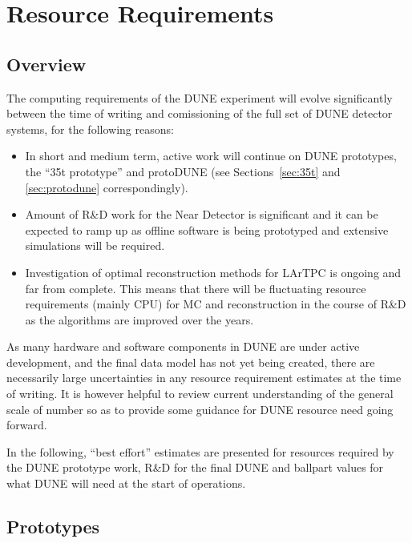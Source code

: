 \section{Resource Requirements}
\subsection{Overview}
The computing requirements of the DUNE experiment will evolve significantly between the time of writing
and comissioning of the full set of DUNE detector systems, for the following reasons:
\begin{itemize}
\item In short and medium term, active work will continue on DUNE prototypes, the ``35t prototype'' and protoDUNE
(see Sections~\ref{sec:35t} and \ref{sec:protodune} correspondingly).

\item Amount of R\&D work for the Near Detector is significant and it can be expected to ramp up as offline software
is being prototyped and extensive simulations will be required.

\item Investigation of optimal reconstruction methods for LArTPC is ongoing and far from complete. This means
that there will be fluctuating resource requirements (mainly CPU) for MC and reconstruction in the course of R\&D
as the algorithms are improved over the years.

\end{itemize}

\noindent
As many hardware and software components in DUNE are under active development,
and the final data model has not yet being created, there are necessarily large uncertainties in any resource requirement estimates
at the time of writing. It is however helpful to review current understanding of the general scale of number so as to provide some
guidance for DUNE resource need going forward.

In the following, ``best effort'' estimates are presented for resources required by the DUNE prototype work,  R\&D for the final DUNE
and ballpart values for what DUNE will need at the start of operations.

\subsection{Prototypes}
